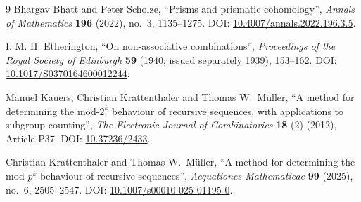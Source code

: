 \documentclass[11pt]{article}
\theoremstyle{definition}
\theoremstyle{remark}
\begin{document}
\begin{thebibliography}{9}
Bhargav Bhatt and Peter Scholze, ``Prisms and prismatic cohomology'', \emph{Annals of
Mathematics} \textbf{196} (2022), no.~3, 1135--1275. DOI:
\href{https://doi.org/10.4007/annals.2022.196.3.5}{10.4007/annals.2022.196.3.5}.

I. M. H. Etherington, ``On non-associative combinations'', \emph{Proceedings of the Royal
Society of Edinburgh} \textbf{59} (1940; issued separately 1939), 153--162. DOI:
\href{https://doi.org/10.1017/S0370164600012244}{10.1017/S0370164600012244}.

Manuel Kauers, Christian Krattenthaler and Thomas W.\ M\"uller, ``A method for determining
the mod-$2^k$ behaviour of recursive sequences, with applications to subgroup counting'',
\emph{The Electronic Journal of Combinatorics} \textbf{18} (2) (2012), Article P37. DOI:
\href{https://doi.org/10.37236/2433}{10.37236/2433}.

Christian Krattenthaler and Thomas W.\ M\"uller, ``A method for determining the
mod-$p^k$ behaviour of recursive sequences'', \emph{Aequationes Mathematicae} \textbf{99}
(2025), no.~6, 2505--2547. DOI:
\href{https://doi.org/10.1007/s00010-025-01195-0}{10.1007/s00010-025-01195-0}.
\end{thebibliography}
\end{document}
